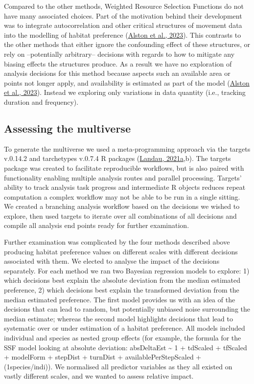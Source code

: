 \documentclass[10pt,a4paper]{article}
\begin{document}
Compared to the other methods, Weighted Resource Selection Functions do not have many associated choices.
Part of the motivation behind their development was to integrate autocorrelation and other critical structures of movement data into the modelling of habitat preference (\protect\hyperlink{ref-alston_mitigating_2023}{Alston et al., 2023}).
This contrasts to the other methods that either ignore the confounding effect of these structures, or rely on --potentially arbitrary-- decisions with regards to how to mitigate any biasing effects the structures produce.
As a result we have no exploration of analysis decisions for this method because aspects such an available area or points not longer apply, and availability is estimated as part of the model (\protect\hyperlink{ref-alston_mitigating_2023}{Alston et al., 2023}).
Instead we exploring only variations in data quantity (i.e., tracking duration and frequency).

\hypertarget{assessing-the-multiverse}{%
\subsection{Assessing the multiverse}\label{assessing-the-multiverse}}

To generate the multiverse we used a meta-programming approach via the targets v.0.14.2 and tarchetypes v.0.7.4 R packages (\protect\hyperlink{ref-targets}{Landau, 2021a},b).
The targets package was created to facilitate reproducible workflows, but is also paired with functionality enabling multiple analysis routes and parallel processing.
Targets' ability to track analysis task progress and intermediate R objects reduces repeat computation a complex workflow may not be able to be run in a single sitting.
We created a branching analysis workflow based on the decisions we wished to explore, then used targets to iterate over all combinations of all decisions and compile all analysis end points ready for further examination.

Further examination was complicated by the four methods described above producing habitat preference values on different scales with different decisions associated with them.
We elected to analyse the impact of the decisions separately.
For each method we ran two Bayesian regression models to explore: 1) which decisions best explain the absolute deviation from the median estimated preference, 2) which decisions best explain the transformed deviation from the median estimated preference.
The first model provides us with an idea of the decisions that can lead to random, but potentially unbiased noise surrounding the median estimate; whereas the second model highlights decisions that lead to systematic over or under estimation of a habitat preference.
All models included individual and species as nested group effects (for example, the formula for the SSF model looking at absolute deviation: absDeltaEst \textasciitilde{} 1 + tdScaled + tfScaled + modelForm + stepDist + turnDist + availablePerStepScaled + (1\textbar species/indi)).
We normalised all predictor variables as they all existed on vastly different scales, and we wanted to assess relative impact.
\end{document}
